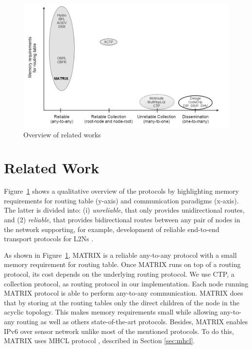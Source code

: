\begin{figure}[!ht]
    \centering
    \includegraphics[width=0.75\linewidth]{Images/overview.png}
    \caption{Overview of related works}
    \label{fig:overview-rel}
\end{figure}

\section{Related Work}
\label{sec:related}

%

Figure~\ref{fig:overview-rel} shows a qualitative overview of the protocols by highlighting memory requirements for routing table (y-axis) and communication paradigms (x-axis). The latter is divided into: (i) \textit{unreliable}, that only provides unidirectional routes, and (2) \textit{reliable}, that provides bidirectional routes between any pair of nodes in the network supporting, for example, development of reliable end-to-end transport protocols for L2Ns \cite{flush, RCRT, STCP, xctp}.

As shown in Figure~\ref{fig:overview-rel}, MATRIX is a reliable any-to-any protocol with a small memory requirement for routing table. Once MATRIX runs on top of a routing protocol, its cost depends on the underlying routing protocol. We use CTP, a collection protocol, as routing protocol in our implementation. Each node running MATRIX protocol is able to perform any-to-any communication. MATRIX does that by storing at the routing tables only the direct children of the node in the acyclic topology. This makes memory requirements small while allowing any-to-any routing as well as others state-of-the-art protocols. Besides, MATRIX enables IPv6 over sensor network unlike most of the mentioned protocols. To do this, MATRIX uses MHCL protocol \cite{mhcl}, described in Section \ref{sec:mhcl}.

